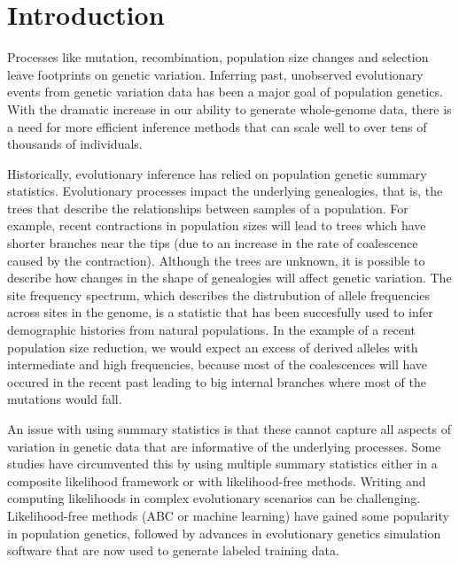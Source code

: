 \section{Introduction}

Processes like mutation, recombination, population size changes and selection leave footprints on genetic variation.
Inferring past, unobserved evolutionary events from genetic variation data has been a major goal of population genetics.
With the dramatic increase in our ability to generate whole-genome data,
there is a need for more efficient inference methods that can scale well to over tens of thousands of individuals.

Historically, evolutionary inference has relied on population genetic summary statistics.
Evolutionary processes impact the underlying genealogies, that is, the trees that describe the relationships between samples of a population.
For example, recent contractions in population sizes will lead to trees which have shorter branches near the tips (due to an increase in the rate of coalescence caused by the contraction).
Although the trees are unknown, it is possible to describe how changes in the shape of genealogies will affect genetic variation.
The site frequency spectrum,
which describes the distrubution of allele frequencies across sites in the genome,
is a statistic that has been succesfully used to infer demographic histories from natural populations.
In the example of a recent population size reduction,
we would expect an excess of derived alleles with intermediate and high frequencies,
because most of the coalescences will have occured in the recent past leading to big internal branches where most of the mutations would fall.


An issue with using summary statistics is that these cannot capture all aspects of variation in genetic data that are informative of the underlying processes.
Some studies have circumvented this by using multiple summary statistics either in a composite likelihood framework or with likelihood-free methods.
Writing and computing likelihoods in complex evolutionary scenarios can be challenging.
Likelihood-free methods (\eg ABC or machine learning) have gained some popularity in population genetics,
followed by advances in evolutionary genetics simulation software that are now used to generate labeled training data.

